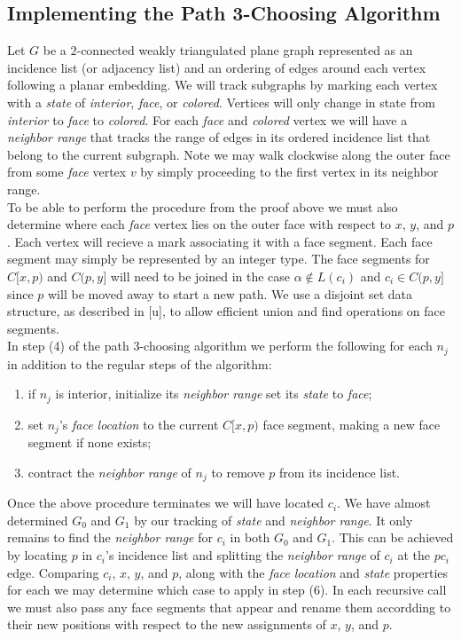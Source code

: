 \documentclass[11pt,letter]{article}
\begin{document}
\subsection*{Implementing the Path 3-Choosing Algorithm}

Let $G$ be a $2$-connected weakly triangulated plane graph represented as an incidence list (or adjacency list)
and an ordering of edges around each vertex following a planar embedding.
We will track subgraphs by marking each vertex with a \emph{state} of \emph{interior},
\emph{face}, or \emph{colored}. Vertices will only change in state from \emph{interior} to \emph{face} to
\emph{colored}. For each \emph{face} and \emph{colored} vertex we will have a \emph{neighbor range}
that tracks the range of edges in its ordered incidence list that belong to the current subgraph. 
Note we may walk clockwise along the outer face from some
\emph{face} vertex $v$ by simply proceeding to the first vertex in its neighbor range.\\

\noindent To be able to perform the procedure from the proof above we must also determine where each \emph{face} vertex
lies on the outer face with respect to $x$, $y$, and $p$. Each vertex will recieve a mark associating it with a
face segment. Each face segment may simply be represented by an integer type. The face segments for $C[x,p)$ and
$C(p,y]$ will need to be joined in the case $\alpha\not\in L(c_i)$
and $c_i\in C(p,y]$ since $p$ will be moved away to start a new path. We use a disjoint set data structure,
as described in [u], to allow efficient union and find operations on face segments.\\

\noindent In step (4) of the path 3-choosing algorithm we perform
the following for each $n_j$ in addition to the regular steps of the algorithm:

\begin{enumerate}
\item if $n_j$ is interior, initialize its \emph{neighbor range} set its \emph{state} to \emph{face};
\item set $n_j$'s \emph{face location} to the current $C[x,p)$ face segment, making a new face segment if none exists;
\item contract the \emph{neighbor range} of $n_j$ to remove $p$ from its incidence list.
\end{enumerate}

\noindent Once the above procedure terminates we will have located $c_i$. We have almost determined $G_0$ and $G_1$
by our tracking of \emph{state} and \emph{neighbor range}. It only remains to find
the \emph{neighbor range} for $c_i$ in both $G_0$ and $G_1$. This can be achieved by locating $p$ in
$c_i$'s incidence list and splitting the \emph{neighbor range} of $c_i$ at the $pc_i$ edge. Comparing $c_i$, $x$,
$y$, and $p$, along with the \emph{face location} and \emph{state} properties for each we may determine which case
to apply in step (6). In each recursive call we must also pass any face segments that appear and rename
them accordding to their new positions with respect to the new assignments of $x$, $y$, and $p$.
\end{document}
